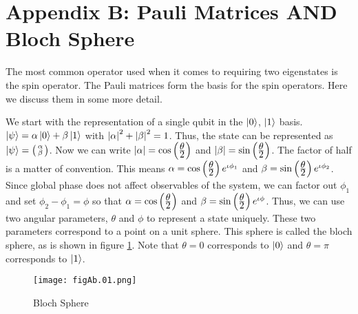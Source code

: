 \section*{Appendix B: Pauli Matrices AND Bloch Sphere}
\label{appB}
The most common operator used when it comes to requiring two eigenstates is the spin operator. The Pauli matrices form the basis for the spin operators. Here we discuss them in some more detail.

We start with the representation of a single qubit in the $\left\vert 0\right\rangle$, $\left\vert 1\right\rangle$ basis. $\left\vert \psi\right\rangle=\alpha\left\vert 0\right\rangle+\beta\left\vert 1\right\rangle$ with $\left\lvert \alpha\right\rvert^2+\left\lvert \beta\right\rvert^2=1$. Thus, the state can be represented as  $\left\vert \psi\right\rangle = \bigl( \begin{smallmatrix}\alpha \\ \beta\end{smallmatrix}\bigr)$. Now we can write $\left\lvert \alpha\right\rvert=\cos\left(\frac{\displaystyle \theta}{\displaystyle 2}\right)$ and $\left\lvert \beta\right\rvert=\sin\left(\frac{\displaystyle \theta}{\displaystyle 2}\right)$. The factor of half is a matter of convention. This means $\alpha=\cos\left(\frac{\displaystyle \theta}{\displaystyle 2}\right)e^{\iota\phi_1}$ and $\beta=\sin\left(\frac{\displaystyle \theta}{\displaystyle 2}\right)e^{\iota\phi_2}$. Since global phase does not affect observables of the system, we can factor out $\phi_1$ and set $\phi_2-\phi_1=\phi$ so that $\alpha=\cos\left(\frac{\displaystyle \theta}{\displaystyle 2}\right)$ and $\beta=\sin\left(\frac{\displaystyle \theta}{\displaystyle 2}\right)e^{\iota\phi}$. Thus, we can use two angular parameters, $\theta$ and $\phi$ to represent a state uniquely. These two parameters correspond to a point on a unit sphere. This sphere is called the bloch sphere, as is shown in figure \ref{Fig:Ab.1}. Note that $\theta=0$ corresponds to $\left\vert 0\right\rangle$ and $\theta=\pi$ corresponds to $\left\vert 1\right\rangle$.
\begin{figure}[!htb]
   \begin{minipage}{\textwidth}
     \centering
     \texttt{[image: figAb.01.png]}
     \caption{Bloch Sphere\cite{bsphere}}
     \label{Fig:Ab.1}
   \end{minipage}
\end{figure}

